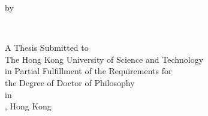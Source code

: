 \thispagestyle{empty}
\null\vskip0.5in
\begin{center}
  \begin{LARGE}
    \thesistitle
  \end{LARGE}
  \vfill
  \vspace{20mm}

  by

  \vspace{4mm}

  \thesisauthor \\
  \vfill
  \vspace{20mm}

  A Thesis Submitted to\\
  The Hong Kong University of Science and Technology \\
  in Partial Fulfillment of the Requirements for\\
  the Degree of Doctor of Philosophy \\
  in \programname \\
  \vfill \vfill
  \thesisdate, Hong Kong
  \vfill
\end{center}

\vfill
